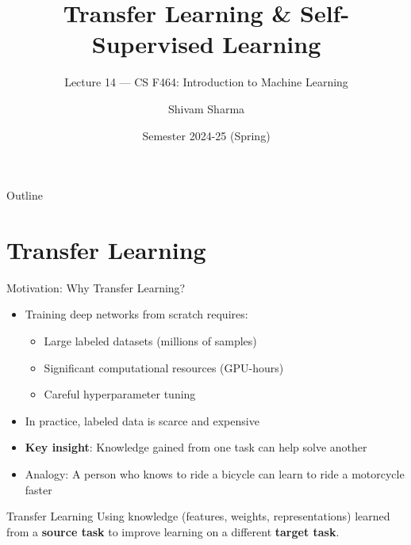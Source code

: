 \documentclass[11pt]{beamer}
\title{Transfer Learning \& Self-Supervised Learning}
\subtitle{Lecture 14 — CS F464: Introduction to Machine Learning}
\author{Shivam Sharma}
\date{Semester 2024-25 (Spring)}
\begin{document}
\maketitle

\begin{frame}{Outline}
    \tableofcontents
\end{frame}

\section{Transfer Learning}

\begin{frame}{Motivation: Why Transfer Learning?}
    \begin{itemize}
        \item Training deep networks from scratch requires:
        \begin{itemize}
            \item Large labeled datasets (millions of samples)
            \item Significant computational resources (GPU-hours)
            \item Careful hyperparameter tuning
        \end{itemize}
        \item In practice, labeled data is scarce and expensive
        \item \textbf{Key insight}: Knowledge gained from one task can help solve another
        \item Analogy: A person who knows to ride a bicycle can learn to ride a motorcycle faster
    \end{itemize}
    \vfill
    \begin{block}{Transfer Learning}
        Using knowledge (features, weights, representations) learned from a \textbf{source task} to improve learning on a different \textbf{target task}.
    \end{block}
\end{frame}
\end{document}
